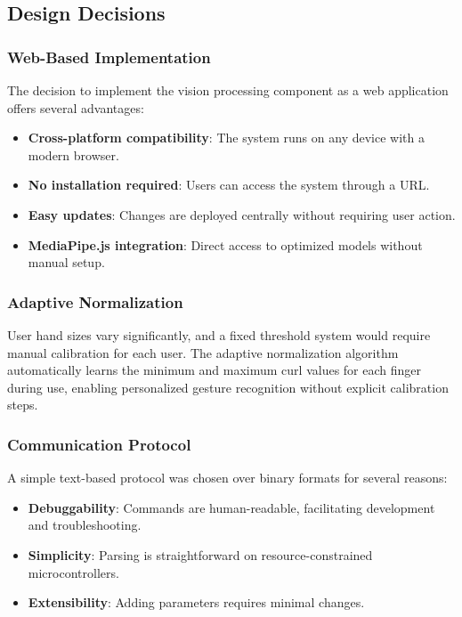 \documentclass[12pt]{article}
\begin{document}
\subsection{Design Decisions}

\subsubsection{Web-Based Implementation}

The decision to implement the vision processing component as a web application offers several advantages:
\begin{itemize}
    \item \textbf{Cross-platform compatibility}: The system runs on any device with a modern browser.
    \item \textbf{No installation required}: Users can access the system through a URL.
    \item \textbf{Easy updates}: Changes are deployed centrally without requiring user action.
    \item \textbf{MediaPipe.js integration}: Direct access to optimized models without manual setup.
\end{itemize}

\subsubsection{Adaptive Normalization}

User hand sizes vary significantly, and a fixed threshold system would require manual calibration for each user. The adaptive normalization algorithm automatically learns the minimum and maximum curl values for each finger during use, enabling personalized gesture recognition without explicit calibration steps.

\subsubsection{Communication Protocol}

A simple text-based protocol was chosen over binary formats for several reasons:
\begin{itemize}
    \item \textbf{Debuggability}: Commands are human-readable, facilitating development and troubleshooting.
    \item \textbf{Simplicity}: Parsing is straightforward on resource-constrained microcontrollers.
    \item \textbf{Extensibility}: Adding parameters requires minimal changes.
\end{itemize}
\end{document}
